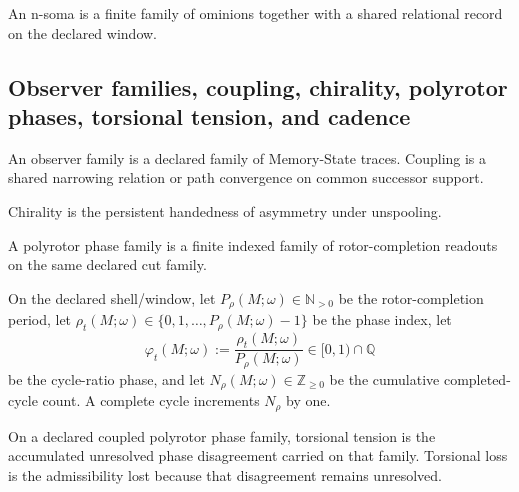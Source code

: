 \begin{definition}
\label{def:n-soma}
An n-soma is a finite family of ominions together with a shared relational record on the declared window.
\end{definition}

\subsection{Observer families, coupling, chirality, polyrotor phases, torsional tension, and cadence}
\begin{definition}
\label{def:observer-coupling}
An observer family is a declared family of Memory-State traces. Coupling is a shared narrowing relation or path convergence on common successor support.
\end{definition}

\begin{definition}[Chirality]
\label{def:chirality}
Chirality is the persistent handedness of asymmetry under unspooling.
\end{definition}

\begin{definition}
\label{def:polyrotor}
A polyrotor phase family is a finite indexed family of rotor-completion readouts on the same declared cut family.
\end{definition}

\begin{definition}
\label{def:rotor-completion}
On the declared shell/window, let $P_\rho(M;\omega)\in \mathbb N_{>0}$ be the rotor-completion period, let $\rho_t(M;\omega)\in\{0,1,\dots,P_\rho(M;\omega)-1\}$ be the phase index, let
\[
\varphi_t(M;\omega):=\frac{\rho_t(M;\omega)}{P_\rho(M;\omega)}\in[0,1)\cap\mathbb Q
\]
be the cycle-ratio phase, and let $N_\rho(M;\omega)\in\mathbb Z_{\ge 0}$ be the cumulative completed-cycle count. A complete cycle increments $N_\rho$ by one.
\end{definition}

\begin{definition}
\label{def:torsional}
On a declared coupled polyrotor phase family, torsional tension is the accumulated unresolved phase disagreement carried on that family. Torsional loss is the admissibility lost because that disagreement remains unresolved.
\end{definition}

